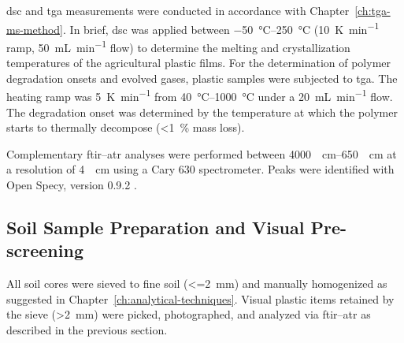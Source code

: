 \ac{dsc} and \ac{tga} measurements were conducted in accordance with Chapter~\ref{ch:tga-ms-method}. In brief, \ac{dsc} was applied between \SIrange[range-phrase={ and }]{-50}{250}{\degreeCelsius} (\SI{10}{\kelvin\per\minute} ramp, \SI{50}{\milli\liter\per\minute}  flow) to determine the melting and crystallization temperatures of the agricultural plastic films.
For the determination of polymer degradation onsets and evolved gases, plastic samples were subjected to \ac{tga}. The heating ramp was \SI{5}{\kelvin\per\minute} from \SIrange[range-phrase={ to }]{40}{1000}{\degreeCelsius} under a \SI{20}{\milli\liter\per\minute}  flow. The degradation onset was determined by the temperature at which the polymer starts to thermally decompose (\SI{<1}{\percent} mass loss).

Complementary \ac{ftir}--\ac{atr} analyses were performed between \SIrange[range-phrase={ and }]{4000}{650}{\per\centi\meter} at a resolution of \SI{4}{\per\centi\meter} using a Cary 630 spectrometer. Peaks were identified with Open Specy, version 0.9.2 \citep{CowgerMicroplastic2021}.

\subsection{Soil Sample Preparation and Visual Pre-screening}
\label{sec:sample-prep}

All soil cores were sieved to fine soil (\SI{<=2}{\milli\meter}) and manually homogenized as suggested in Chapter~\ref{ch:analytical-techniques}. Visual plastic items retained by the sieve (\SI{>2}{\milli\meter}) were picked, photographed, and analyzed via \ac{ftir}--\ac{atr} as described in the previous section.


